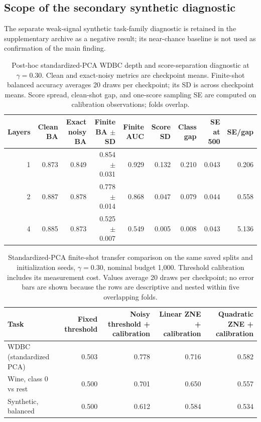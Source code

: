 \documentclass[conference]{IEEEtran}
\begin{document}
\subsection{Scope of the secondary synthetic diagnostic}
The separate weak-signal synthetic task-family diagnostic is retained in the supplementary archive as a negative result; its near-chance baseline is not used as confirmation of the main finding.

\begin{table}[t]\centering\scriptsize
\caption{Post-hoc standardized-PCA WDBC depth and score-separation diagnostic at $\gamma=0.30$. Clean and exact-noisy metrics are checkpoint means. Finite-shot balanced accuracy averages 20 draws per checkpoint; its SD is across checkpoint means. Score spread, clean-shot gap, and one-score sampling SE are computed on calibration observations; folds overlap.}
\label{tab:primary-depth}
\begin{tabular}{@{}r r r r r r r r r@{}}\toprule
Layers & Clean BA & Exact noisy BA & Finite BA $\pm$ SD & Finite AUC & Score SD & Class gap & SE at 500 & SE/gap \\ \midrule
1 & 0.873 & 0.849 & 0.854 $\pm$ 0.031 & 0.929 & 0.132 & 0.210 & 0.043 & 0.206 \\
2 & 0.887 & 0.878 & 0.778 $\pm$ 0.014 & 0.868 & 0.047 & 0.079 & 0.044 & 0.558 \\
4 & 0.885 & 0.873 & 0.525 $\pm$ 0.007 & 0.549 & 0.005 & 0.008 & 0.043 & 5.136 \\
\bottomrule\end{tabular}\end{table}

\begin{table}[t]\centering\small
\caption{Standardized-PCA finite-shot transfer comparison on the same saved splits and initialization seeds, $\gamma=0.30$, nominal budget 1,000. Threshold calibration includes its measurement cost. Values average 20 draws per checkpoint; no error bars are shown because the rows are descriptive and nested within five overlapping folds.}
\label{tab:primary-transfer}
\begin{tabular}{@{}l r r r r@{}}\toprule
Task & Fixed threshold & Noisy threshold + calibration & Linear ZNE + calibration & Quadratic ZNE + calibration \\ \midrule
WDBC (standardized PCA) & 0.503 & 0.778 & 0.716 & 0.582 \\
Wine, class 0 vs rest & 0.500 & 0.701 & 0.650 & 0.557 \\
Synthetic, balanced & 0.500 & 0.612 & 0.584 & 0.534 \\
\bottomrule\end{tabular}\end{table}
\end{document}
